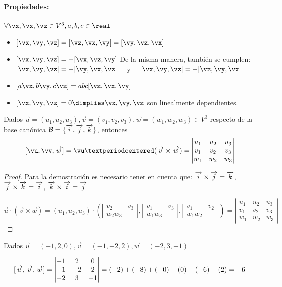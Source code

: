 \paragraph{Propiedades:} $\forall\vx,\vx,\vz\in V^3,a,b,c\in\real$

\begin{itemize}
  \item $[\vx,\vy,\vz]=[\vz,\vx,\vy]=[\vy,\vz,\vx]$ 
  \item $[\vx,\vy,\vz]=-[\vx,\vz,\vy]$ 
  \subitem De la misma manera, también se cumplen: $[\vx,\vy,\vz]=-[\vy,\vx,\vz]\quad$ y $\quad[\vx,\vy,\vz]=-[\vz,\vy,\vx]$
  \item $[a\vx,b\vy,c\vz]=abc[\vz,\vx,\vy]$ 
  \item $[\vx,\vy,\vz]=0 \dimplies \vx,\vy,\vz$ son linealmente dependientes.
\end{itemize}

\begin{prop}

Dados $\vec{u}=(u_1,u_2,u_3),\vec{v}=(v_1,v_2,v_3),\vec{w}=(w_1,w_2,w_3)\in V^3$ respecto de la base canónica $\mathcal{B} = \{\overrightarrow{i},\overrightarrow{j},\overrightarrow{k}\}$, entonces 
\[[\vu,\vv,\vw] = \vu·(\vec{v}\times\vec{w}) = \detwrite{u_1}{u_2}{u_3}{v_1}{v_2}{v_3}{w_1}{w_2}{w_3}\]
\end{prop}

\begin{proof}

Para la demostración es necesario tener en cuenta que: $\overrightarrow{i}\times\overrightarrow{j}=\overrightarrow{k}$, $\overrightarrow{j}\times\overrightarrow{k}=\overrightarrow{i}$, $\overrightarrow{k}\times\overrightarrow{i}=\overrightarrow{j}$

\[
\vec{u}·(\vec{v}\times\vec{w}) = \left(u_1,u_2,u_3\right)·
\left(\left|\begin{matrix}v_2&v_3\\w_2w_3\end{matrix}\right|,
\left|\begin{matrix}v_1&v_3\\w_1w_3\end{matrix}\right|,
\left|\begin{matrix}v_1&v_2\\w_1w_2\end{matrix}\right|\right) = \left|\begin{matrix}u_1&u_2&u_3\\v_1&v_2&v_3\\w_1&w_2&w_3\end{matrix}\right|
\]
\end{proof}


\begin{example}
Dados $\vec{u} = (-1,2,0),\vec{v} = (-1,-2,2), \vec{w} = (-2,3,-1)$


\[
\left[\vec{u},\vec{v},\vec{w}\right] = \detwrite{-1}{2}{0}{-1}{-2}{2}{-2}{3}{-1} = \detwritecalc{-1}{2}{0}{-1}{-2}{2}{-2}{3}{-1}
\]
\end{example}


